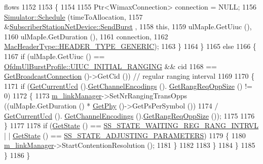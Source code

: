 \begin{DoxyCode}
{       flows}
1152 
1153             \{
1154 
1155               Ptr<WimaxConnection> connection = NULL;
1156               \hyperlink{classns3_1_1Simulator_a671882c894a08af4a5e91181bf1eec13}{Simulator::Schedule} (timeToAllocation,
1157                                    &\hyperlink{classns3_1_1SubscriberStationNetDevice_af7a47a79b3eb7f1c4906381f091b08f3}{SubscriberStationNetDevice::SendBurst}
      ,
1158                                    \textcolor{keyword}{this},
1159                                    ulMapIe.GetUiuc (),
1160                                    ulMapIe.GetDuration (),
1161                                    connection,
1162                                    \hyperlink{classns3_1_1MacHeaderType_a54d8fc8bc93a2b7865627965cdd31c20a48fe5b2f20cadf78008c71469b518403}{MacHeaderType::HEADER\_TYPE\_GENERIC});
1163             \}
1164         \}
1165       \textcolor{keywordflow}{else}
1166         \{
1167           \textcolor{keywordflow}{if} (ulMapIe.GetUiuc () == \hyperlink{classns3_1_1OfdmUlBurstProfile_ae528783c4b3c6700ff49dfd7a555cb3daaea7b6256d4bcd0125f0248c0560c94e}{OfdmUlBurstProfile::UIUC\_INITIAL\_RANGING}
       && cid
1168               == \hyperlink{classns3_1_1WimaxNetDevice_a11d2c7bbd695e2c845a821ec15baa2aa}{GetBroadcastConnection} ()->GetCid ()) \textcolor{comment}{// regular ranging interval}
1169 
1170             \{
1171               \textcolor{keywordflow}{if} (\hyperlink{classns3_1_1WimaxNetDevice_adbd7f3476ff5df6f9babaf4f5de689ae}{GetCurrentUcd} ().\hyperlink{classns3_1_1Ucd_a74f5caa2bb047b8994fa04b15ea6efc9}{GetChannelEncodings} ().
      \hyperlink{classns3_1_1UcdChannelEncodings_a27d75585bcae3837f08a4220f1d5eba4}{GetRangReqOppSize} () != 0)
1172                 \{
1173                   \hyperlink{classns3_1_1SubscriberStationNetDevice_a24e7df59fb312c196318f0366b63c6e6}{m\_linkManager}->SetNrRangingTransOpps ((ulMapIe.GetDuration () * 
      \hyperlink{classns3_1_1WimaxNetDevice_a81c1f9d43acfc9cd5d642b784102a21f}{GetPhy} ()->GetPsPerSymbol ())
1174                                                         / \hyperlink{classns3_1_1WimaxNetDevice_adbd7f3476ff5df6f9babaf4f5de689ae}{GetCurrentUcd} ().
      \hyperlink{classns3_1_1Ucd_a74f5caa2bb047b8994fa04b15ea6efc9}{GetChannelEncodings} ().\hyperlink{classns3_1_1UcdChannelEncodings_a27d75585bcae3837f08a4220f1d5eba4}{GetRangReqOppSize} ());
1175 
1176                 \}
1177 
1178               \textcolor{keywordflow}{if} (\hyperlink{classns3_1_1WimaxNetDevice_a4b7a2a630af23ac97b1012d5e5facc9f}{GetState} () == \hyperlink{classns3_1_1SubscriberStationNetDevice_af9f145bc05df1f18610a3d4b61ff9ee4a49bac6877dbda9589f7576e42cf5c15f}{SS\_STATE\_WAITING\_REG\_RANG\_INTRVL} |
      | \hyperlink{classns3_1_1WimaxNetDevice_a4b7a2a630af23ac97b1012d5e5facc9f}{GetState} () == \hyperlink{classns3_1_1SubscriberStationNetDevice_af9f145bc05df1f18610a3d4b61ff9ee4ab966447e17e355aff9bf29f0a92bd4a5}{SS\_STATE\_ADJUSTING\_PARAMETERS})
1179                 \{
1180                   \hyperlink{classns3_1_1SubscriberStationNetDevice_a24e7df59fb312c196318f0366b63c6e6}{m\_linkManager}->StartContentionResolution ();
1181                 \}
1182 
1183             \}
1184         \}
1185     \}
1186 \}
\end{DoxyCode}


